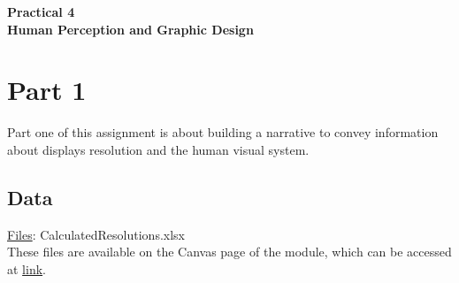 \documentclass[11pt]{article}
\begin{document}
\pagestyle{fancy}
\renewcommand{\headrulewidth}{0pt}

\begin{center}
\vspace*{1cm}
{\textbf {\Huge Practical 4}}\\
\vspace*{0.5cm}
{\textbf {\huge Human Perception and Graphic Design}}
\vspace*{1cm}
\end{center}

\section{Part 1}

Part one of this assignment is about building a narrative to convey information about displays resolution and the human visual system.

\subsection*{Data}

\underline{Files}: CalculatedResolutions.xlsx\\
These files are available on the Canvas page of the module, which can be accessed at \href{https://ncl.instructure.com/courses/49730}{link}.\\
\end{document}
